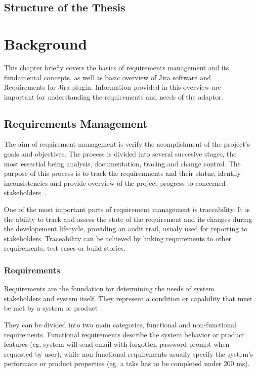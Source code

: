 \section{Structure of the Thesis}


\chapter{Background}
This chapter briefly covers the basics of requirements management and its fundamental concepts, as well as basic overview of Jira software and Requirements for Jira plugin. Information provided in this overview are important for understanding the requirements and needs of the adaptor. 

\section{Requirements Management}
The aim of requirement management is verify the acomplishment of the project's goals and objectives. The process is divided into several succesive stages, the most essectial being analysis, documentation, tracing and change control. The purpose of this process is to track the requiremnents and their status, identify inconsistencies and provide overview of the project progress to concerned stakeholders \cite{requirements_management}.

One of the most important parts of requirement management is traceability. It is the ability to track and assess the state of the requirement and its changes during the developement lifecycle, providing an audit trail, usualy used for reporting to stakeholders. Traceability can be achieved by linking requirements to other requirements, test cases or build stories.

\subsection*{Requirements}
Requirements are the foundation for determining the needs of system stakeholders and system itself. They represent a condition or capability
that must be met by a system or product \cite{IEEE_24765-2017}.

They can be divided into two main categories, functional and non-functional requirements. Functional requirements describe the system behavior or product features (eg. system will send email with forgotten password prompt when requested by user), while non-functional requirements usually specify the system's performace or product properties (eg. a taks has to be completed under 200 ms).

